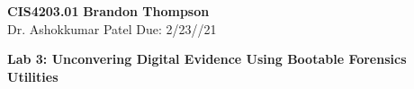 \noindent
\textbf{CIS4203.01} \hfill \textbf{Brandon Thompson} \\
\normalsize Dr. Ashokkumar Patel \hfill Due: 2/23//21\\

\begin{center}
\textbf{Lab 3: Unconvering Digital Evidence Using Bootable Forensics Utilities}
\end{center}